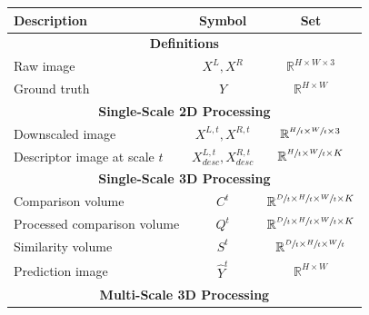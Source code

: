\documentclass[runningheads]{llncs}
\begin{document}
\begin{table}[t]
    \centering
    \begin{tabular}{ l|c|c }
    Description & Symbol & Set \rule{0pt}{2ex}\\
    
    \hline
    \multicolumn{3}{c}{ \textbf{Definitions} } \rule{0pt}{2.4ex}\\
    \hline
    
    Raw image & $X^L, X^R$ & $\mathbb{R}^{H \times W \times 3}$ \rule{0pt}{2.5ex} \\
    
    Ground truth & $Y$ & $\mathbb{R}^{H \times W}$ \rule{0pt}{2.5ex} \\
    
    \hline
    \multicolumn{3}{c}{ \textbf{Single-Scale 2D Processing} } \rule{0pt}{2.4ex}\\
    \hline
    
    Downscaled image & $X^{L,t}, X^{R, t}$ & $\mathbb{R}^{\sfrac{H}{t} \times \sfrac{W}{t} \times 3}$ \rule{0pt}{3ex} \\
    
    Descriptor image at scale $t$ & $X^{L,t}_{desc}, X^{R, t}_{desc}$ & $\mathbb{R}^{\sfrac{H}{t} \times \sfrac{W}{t} \times K}$ \rule{0pt}{3.5ex} \rule[-1.3ex]{0pt}{0pt}\\
    
    \hline
    \multicolumn{3}{c}{ \textbf{Single-Scale 3D Processing} } \rule{0pt}{2.4ex}\\
    \hline
    
    Comparison volume & $C^{t}$ & $ \mathbb{R}^{ \sfrac{D}{t} \times \sfrac{H}{t} \times \sfrac{W}{t} \times K } $ \rule{0pt}{3ex} \\
    
    Processed comparison volume & $Q^{t}$ & $ \mathbb{R}^{ \sfrac{D}{t} \times \sfrac{H}{t} \times \sfrac{W}{t} \times K } $ \rule{0pt}{3ex} \\
    
    Similarity volume & $S^{t}$ & $ \mathbb{R}^{ \sfrac{D}{t} \times \sfrac{H}{t} \times \sfrac{W}{t}} $  \rule{0pt}{3.5ex} \\
    
    Prediction image & $\hat{Y}^{t}$ & $\mathbb{R}^{H \times W}$ \rule{0pt}{3.5ex} \\
    
    \hline
    \multicolumn{3}{c}{ \textbf{Multi-Scale 3D Processing} } \rule{0pt}{2.4ex} \\
    \hline
    

\end{tabular}
\end{table}
\end{document}
